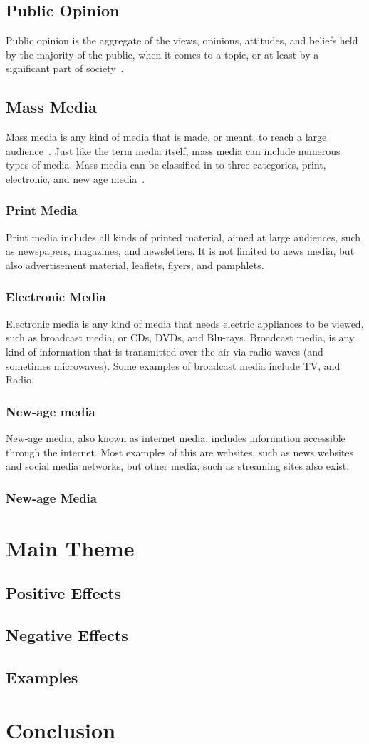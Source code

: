 \documentclass[a4paper,12pt]{article}
\begin{document}
\subsection{Public Opinion}
Public opinion is the aggregate of the views, opinions, attitudes, and beliefs held by the majority of the public,
when it comes to a topic, or at least by a significant part of society~\parencite{davison2024public}.
\subsection{Mass Media}
Mass media is any kind of media that is made, or meant, to reach a large audience~\parencite{duignan2024mass}.
Just like the term media itself, mass media can include numerous types of media.
Mass media can be classified in to three categories, print, electronic, and new age media~\parencite{manohar2008different}.
\subsubsection{Print Media}
Print media includes all kinds of printed material, aimed at large audiences, such as newspapers, magazines, and newsletters.
It is not limited to news media, but also advertisement material, leaflets, flyers, and pamphlets.
\subsubsection{Electronic Media}
Electronic media is any kind of media that needs electric appliances to be viewed, such as broadcast media, or CDs, DVDs, and Blu-rays.
Broadcast media, is any kind of information that is transmitted over the air via radio waves (and sometimes microwaves).
Some examples of broadcast media include TV, and Radio.
\subsubsection{New-age media}
New-age media, also known as internet media, includes information accessible through the internet.
Most examples of this are websites, such as news websites and social media networks, but other media, such as streaming sites also exist.

\subsubsection{New-age Media}

\section{Main Theme}
\subsection{Positive Effects}
\subsection{Negative Effects}
\subsection{Examples}

\section{Conclusion}

\newpage
\printbibliography
\end{document}
